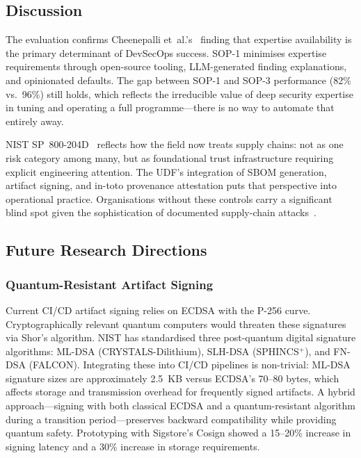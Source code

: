 \documentclass[letterpaper, 10pt, conference]{ieeeconf}
\begin{document}
\subsection{Discussion}

The evaluation confirms Cheenepalli et~al.'s~\cite{cheenepalli2025}
finding that expertise availability is the primary determinant of
DevSecOps success. SOP-1 minimises expertise requirements through
open-source tooling, LLM-generated finding explanations, and opinionated
defaults. The gap between SOP-1 and SOP-3 performance (82\% vs.\ 96\%)
still holds, which reflects the irreducible value of deep security
expertise in tuning and operating a full programme---there is no way to
automate that entirely away.

NIST SP~800-204D~\cite{nist2024} reflects how the field now treats supply
chains: not as one risk category among many, but as foundational trust
infrastructure requiring explicit engineering attention. The UDF's
integration of SBOM generation, artifact signing, and in-toto provenance
attestation puts that perspective into operational practice. Organisations
without these controls carry a significant blind spot given the
sophistication of documented supply-chain attacks~\cite{solanke2022}.

\subsection{Future Research Directions}

\subsubsection{Quantum-Resistant Artifact Signing}

Current CI/CD artifact signing relies on ECDSA with the P-256 curve.
Cryptographically relevant quantum computers would threaten these
signatures via Shor's algorithm. NIST has standardised three
post-quantum digital signature algorithms: ML-DSA (CRYSTALS-Dilithium),
SLH-DSA (SPHINCS$^+$), and FN-DSA (FALCON). Integrating these into
CI/CD pipelines is non-trivial: ML-DSA signature sizes are approximately
2.5~KB versus ECDSA's 70--80 bytes, which affects storage and
transmission overhead for frequently signed artifacts. A hybrid
approach---signing with both classical ECDSA and a quantum-resistant
algorithm during a transition period---preserves backward compatibility
while providing quantum safety. Prototyping with Sigstore's Cosign
showed a 15--20\% increase in signing latency and a 30\% increase in
storage requirements.
\end{document}
